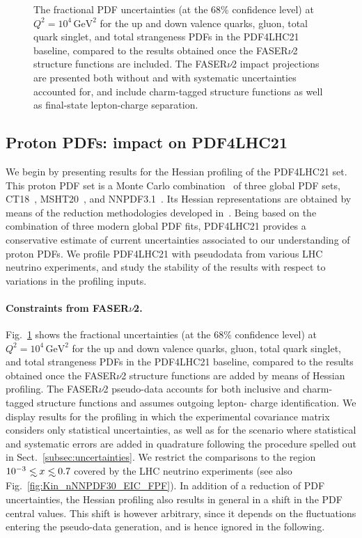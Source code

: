 \begin{figure}[t]
\caption{
The fractional PDF uncertainties (at the 68\% confidence level) at $Q^2 = 10^4 \, \textrm{GeV}^2$ 
for the up and down valence quarks, gluon, total quark singlet, and total strangeness PDFs
in the PDF4LHC21 baseline, compared to the results obtained once the FASER$\nu$2 structure
functions are included.
%
The FASER$\nu$2 impact projections are presented both without and with systematic
uncertainties accounted for, and include charm-tagged structure functions
as well as final-state lepton-charge separation.
%
}
\label{fig:FASERnu2_baseline}
\end{figure}

\subsection{Proton PDFs: impact on PDF4LHC21}
\label{sec:pdf4lhc21}

We begin by presenting results for the Hessian profiling of
the PDF4LHC21 set.
%
This proton PDF set is a Monte Carlo combination~\cite{Watt:2012tq,Carrazza:2015hva} of three global PDF sets, CT18~\cite{Hou:2019efy},
MSHT20~\cite{Bailey:2020ooq}, and NNPDF3.1~\cite{NNPDF:2017mvq}.
%
Its Hessian representations are obtained by means of the reduction methodologies developed in~\cite{Gao:2013bia,Carrazza:2015aoa,Carrazza:2016htc}.
%
Being based on the combination of three modern global PDF fits, PDF4LHC21 provides a conservative estimate
of  current uncertainties associated to our understanding of proton PDFs.
%
We profile PDF4LHC21 with pseudodata from various LHC neutrino experiments,
and study the stability of the results with respect to variations in the profiling inputs.

\paragraph{Constraints from FASER$\nu$2.}
%
Fig.~\ref{fig:FASERnu2_baseline} shows the
fractional uncertainties (at the 68\% confidence level) at $Q^2 = 10^4 \, \textrm{GeV}^2$ 
for the up and down valence quarks, gluon, total quark singlet, and total strangeness PDFs
in the PDF4LHC21 baseline, compared to the results obtained once the FASER$\nu$2 structure functions are
added by means of Hessian profiling.
%
The FASER$\nu$2 pseudo-data accounts for  both  inclusive and charm-tagged structure functions
and assumes outgoing lepton- charge identification.
%
We display results for the profiling in which the experimental covariance matrix
considers only statistical uncertainties, as well as for the scenario where
statistical and systematic errors are added in quadrature following
the procedure spelled out in Sect.~\ref{subsec:uncertainties}.
%
We restrict the comparisons to the region $10^{-3}\lsim x \lsim 0.7$ covered
by the LHC neutrino experiments (see also Fig.~\ref{fig:Kin_nNNPDF30_EIC_FPF}).
%
In addition of a reduction of PDF uncertainties, the Hessian profiling
also results in general in a shift in the PDF central values.
%
This shift is however arbitrary, since it 
depends on the fluctuations
entering the pseudo-data generation, and is hence ignored in the following.

